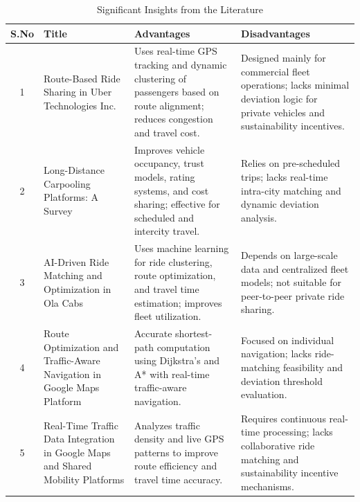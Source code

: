 \documentclass[conference]{IEEEtran}
\begin{document}
\vspace{4pt}
\begin{table}[!h]
\centering
\footnotesize
\renewcommand{\arraystretch}{1.3}
\setlength{\tabcolsep}{2pt}

\begin{tabular}{|c|p{1.8cm}|p{2.6cm}|p{2.6cm}|}
\hline
\textbf{S.No} & \textbf{Title} & \textbf{Advantages} & \textbf{Disadvantages} \\
\hline


1 &
Route-Based Ride Sharing in Uber Technologies Inc. &
Uses real-time GPS tracking and dynamic clustering of passengers based on route alignment; reduces congestion and travel cost. &
Designed mainly for commercial fleet operations; lacks minimal deviation logic for private vehicles and sustainability incentives. \\
\hline

2 &
Long-Distance Carpooling Platforms: A Survey &
Improves vehicle occupancy, trust models, rating systems, and cost sharing; effective for scheduled and intercity travel. &
Relies on pre-scheduled trips; lacks real-time intra-city matching and dynamic deviation analysis. \\
\hline

3 &
AI-Driven Ride Matching and Optimization in Ola Cabs &
Uses machine learning for ride clustering, route optimization, and travel time estimation; improves fleet utilization. &
Depends on large-scale data and centralized fleet models; not suitable for peer-to-peer private ride sharing. \\
\hline

4 &
Route Optimization and Traffic-Aware Navigation in Google Maps Platform &
Accurate shortest-path computation using Dijkstra’s and A* with real-time traffic-aware navigation. &
Focused on individual navigation; lacks ride-matching feasibility and deviation threshold evaluation. \\
\hline

5 &
Real-Time Traffic Data Integration in Google Maps and Shared Mobility Platforms &
Analyzes traffic density and live GPS patterns to improve route efficiency and travel time accuracy. &
Requires continuous real-time processing; lacks collaborative ride matching and sustainability incentive mechanisms. \\
\hline

\end{tabular}

\vspace{2pt}
\caption{Significant Insights from the Literature}
\end{table}
\end{document}
